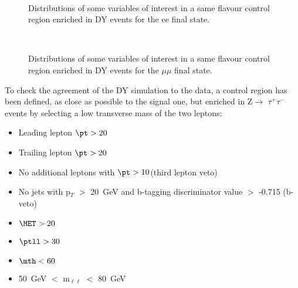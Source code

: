 \begin{figure}[htb]
\centering
{}
\\
\caption{
   Distributions of some variables of interest in a same flavour control region enriched in DY events for the ee final state.}
    \label{fig:DY_ee}
\end{figure}

\begin{figure}[htb]
\centering
{}
\\
\caption{
   Distributions of some variables of interest in a same flavour control region enriched in DY events for the $\mu\mu$ final state.}
    \label{fig:DY_mm}
\end{figure}

To check the agreement of the DY simulation to the data, a control region has been defined, as close as possible to the signal one, but enriched in Z$\rightarrow$ $\tau^+ \tau^-$ events by selecting a low transverse mass of the two leptons:

\begin{itemize}
\item Leading lepton $\pt > 20$\GeV
\item Trailing lepton $\pt > 20$\GeV
\item No additional leptons with $\pt >10$\GeV (third lepton veto)
\item No jets with p$_T$ $>$ 20~GeV and b-tagging discriminator value $>$ -0.715 (b-veto)
\item $\MET>20$\GeV
\item $\ptll>30$\GeV
\item $\mth<60$\GeV
\item 50~GeV $<$ m$_{\ell\ell}$ $<$ 80~GeV
\end{itemize}

